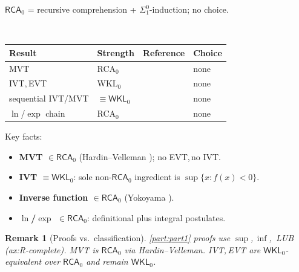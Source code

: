 \documentclass[11pt,reqno]{amsart}
\theoremstyle{redplain}
\newtheorem{remark}[theorem]{Remark}
\begin{document}
$\mathsf{RCA}_0$ = recursive comprehension + $\Sigma^0_1$-induction; no
choice.

\begin{center}
{\small \ \noindent%
\begin{tabular}{|>{\raggedright\arraybackslash}m{4.5cm}|>{\centering\arraybackslash}m{2.2cm}|>{\centering\arraybackslash}m{3.2cm}|>{\centering\arraybackslash}m{1.3cm}|}
\hline
\textbf{Result} & \textbf{Strength} & \textbf{Reference} & \textbf{Choice}
\\ \hline
\textsf{MVT} & \textsf{RCA$_0$} & \cite{HardinVelleman2001} & \textsf{none}
\\ \hline
\textsf{IVT},\,\allowbreak \textsf{EVT} & \textsf{WKL$_0$} & \cite%
{Simpson2009} & \textsf{none} \\ \hline
\textsf{sequential IVT/MVT} & $\equiv\mathsf{WKL}_0$ & \cite%
{Simpson2009,Sanders2020} & \textsf{none} \\ \hline
$\ln$/$\exp$ chain & \textsf{RCA$_0$} & \cite{Yokoyama2010} & \textsf{none}
\\ \hline
\end{tabular}
}
\end{center}

\noindent Key facts:

\begin{itemize}
\item \textbf{MVT $\in\mathsf{RCA}_0$} (Hardin--Velleman \cite%
{HardinVelleman2001}); no EVT,\,\allowbreak no IVT.

\item \textbf{IVT $\equiv\mathsf{WKL}_0$}: sole non-$\mathsf{RCA}_0$
ingredient is $\sup\{x:f(x)<0\}$.

\item \textbf{Inverse function $\in\mathsf{RCA}_0$} (Yokoyama \cite[Thm.~3.22%
]{Yokoyama2010}).

\item \textbf{$\ln$/$\exp$ $\in\mathsf{RCA}_0$}: definitional plus integral
postulates.
\end{itemize}

\setcounter{theorem}{0}

\begin{remark}[Proofs vs.\ classification]
\autoref{part:part1} proofs use $\sup$,\,\allowbreak $\inf$,\,\allowbreak
LUB (\textsf{ax:R-complete}). MVT is $\mathsf{RCA}_0$ via Hardin--Velleman.
IVT,\,\allowbreak EVT are $\mathsf{WKL}_0$-equivalent over $\mathsf{RCA}_0$
and remain $\mathsf{WKL}_0$.
\end{remark}
\end{document}
